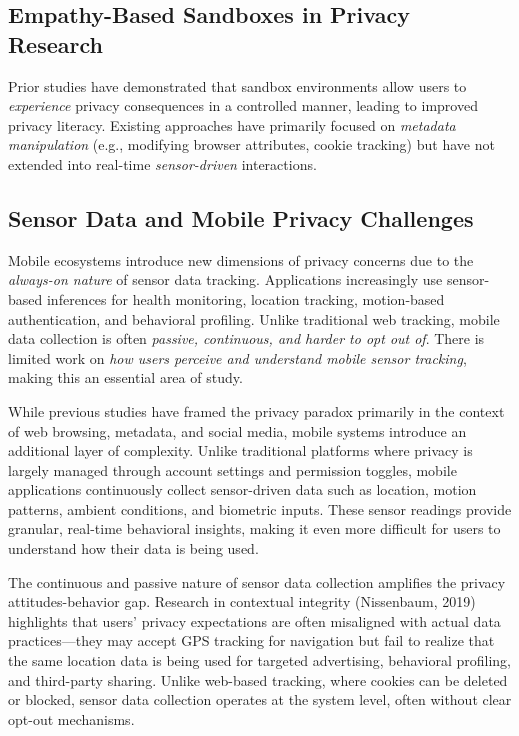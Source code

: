 \documentclass[acmlarge, nonacm]{acmart}
\begin{document}
\subsection{Empathy-Based Sandboxes in Privacy Research}
Prior studies have demonstrated that sandbox environments allow users to \textit{experience} privacy consequences in a controlled manner, leading to improved privacy literacy. Existing approaches have primarily focused on \textit{metadata manipulation} (e.g., modifying browser attributes, cookie tracking) but have not extended into real-time \textit{sensor-driven} interactions.

\subsection{Sensor Data and Mobile Privacy Challenges}
Mobile ecosystems introduce new dimensions of privacy concerns due to the \textit{always-on nature} of sensor data tracking. Applications increasingly use sensor-based inferences for health monitoring, location tracking, motion-based authentication, and behavioral profiling. Unlike traditional web tracking, mobile data collection is often \textit{passive, continuous, and harder to opt out of}. There is limited work on \textit{how users perceive and understand mobile sensor tracking}, making this an essential area of study.

While previous studies have framed the privacy paradox primarily in the context of web browsing, metadata, and social media, mobile systems introduce an additional layer of complexity. Unlike traditional platforms where privacy is largely managed through account settings and permission toggles, mobile applications continuously collect sensor-driven data such as location, motion patterns, ambient conditions, and biometric inputs. These sensor readings provide granular, real-time behavioral insights, making it even more difficult for users to understand how their data is being used.

The continuous and passive nature of sensor data collection amplifies the privacy attitudes-behavior gap. Research in contextual integrity (Nissenbaum, 2019) highlights that users’ privacy expectations are often misaligned with actual data practices—they may accept GPS tracking for navigation but fail to realize that the same location data is being used for targeted advertising, behavioral profiling, and third-party sharing. Unlike web-based tracking, where cookies can be deleted or blocked, sensor data collection operates at the system level, often without clear opt-out mechanisms.
\end{document}
